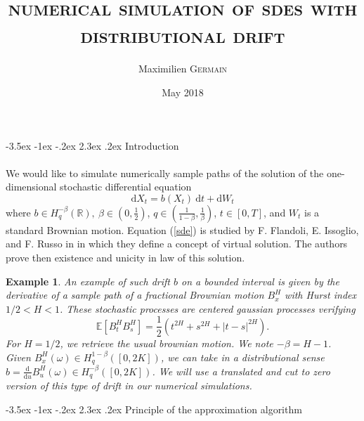 \documentclass[11pt]{article}
\makeatletter
\renewcommand\section{\@startsection {section}{1}{\z@}%
    {-3.5ex \@plus -1ex \@minus -.2ex}%
    {2.3ex \@plus.2ex}%
    {\centering\large\scshape\bfseries}}
\newcommand{\de}[2]{\frac{\mathrm{d} #1}{\mathrm{d} #2}}
\newtheorem{ex}{Example}
\newcommand{\R}{\mathbb{R}}
\newcommand{\E}{\mathbb{E}}
\newcommand{\di}{\mathrm{d}}
\makeatother
\begin{document}
\title{\Large \textsc{\textbf{numerical simulation of sdes with distributional drift}}} \author{Maximilien \textsc{Germain} \date{May 2018}}
\maketitle

\section{Introduction}
\paragraph{}
We would like to simulate numerically sample paths of the solution of the one-dimensional stochastic differential equation
\begin{equation} \label{sde}
\di X_t = b(X_t)\ \di t + \di W_t
\end{equation}
where $b\in H^{-\beta}_q(\R),\ \beta\in\left(0,\frac{1}{2}\right)$, $q\in\left(\frac{1}{1-\beta},\frac{1}{\beta}\right)$, $t\in[0,T]$, and $W_t$ is a standard Brownian motion. Equation (\ref{sde}) is studied by F. Flandoli, E. Issoglio, and F. Russo in \cite{Fla-Iss-Rus-2017} in which they define a concept of virtual solution. The authors prove then existence and unicity in law of this solution. 

\begin{ex}
    An example of such drift $b$ on a bounded interval is given by the derivative of a sample path of a fractional Brownian motion $B^H_x$ with Hurst index $1/2<H<1$. These stochastic processes are centered gaussian processes verifying \begin{equation}
    \E\left[B_t^HB_s^H\right]=\frac{1}{2}\left(t^{2H}+s^{2H}+|t-s|^{2H}\right).
    \end{equation} For $H=1/2$, we retrieve the usual brownian motion. We note $-\beta = H - 1$. Given $B^H_x(\omega)\in H^{1-\beta}_q([0,2K])$, we can take in a distributional sense $b = \de{}{u}B^H_u(\omega)\in H^{-\beta}_q([0,2K])$. We will use a translated and cut to zero version of this type of drift in our numerical simulations.
\end{ex}    

\section{Principle of the approximation algorithm}
\end{document}

